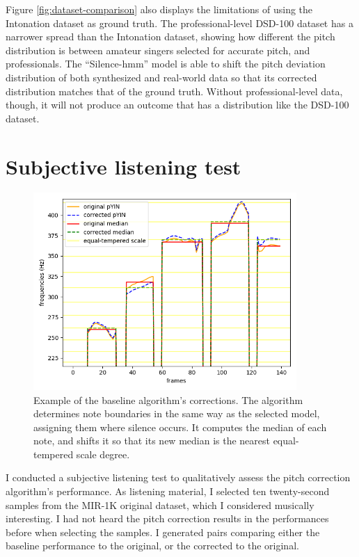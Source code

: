 Figure \ref{fig:dataset-comparison} also displays the limitations of using the Intonation dataset as ground truth. The professional-level DSD-100 dataset has a narrower spread than the Intonation dataset, showing how different the pitch distribution is between amateur singers selected for accurate pitch, and professionals. The ``Silence-\gls{hmm}'' model is able to shift the pitch deviation distribution of both synthesized and real-world data so that its corrected distribution matches that of the ground truth. Without professional-level data, though, it will not produce an outcome that has a distribution like the DSD-100 dataset.


\section{Subjective listening test}
\label{sec:subjective-test}
\begin{figure}[t!]
    \centering
    \includegraphics[width=10cm]{figures/baseline_tuning.png}
    \caption{Example of the baseline algorithm's corrections. The algorithm determines note boundaries in the same way as the selected model, assigning them where silence occurs. It computes the median of each note, and shifts it so that its new median is the nearest equal-tempered scale degree.}
    \label{fig:baseline_tuning}
\end{figure}

I conducted a subjective listening test to qualitatively assess the pitch correction algorithm's performance. As listening material, I selected ten twenty-second samples from the MIR-1K original dataset, which I considered musically interesting. I had not heard the pitch correction results in the performances before when selecting the samples. I generated pairs comparing either the baseline performance to the original, or the corrected to the original. 

